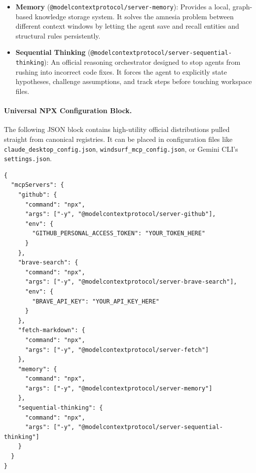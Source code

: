 \begin{itemize}
    \item \textbf{Memory} (\lstinline[style=inline]|@modelcontextprotocol/server-memory|): Provides a local, graph-based knowledge storage system. It solves the amnesia problem between different context windows by letting the agent save and recall entities and structural rules persistently.
    \item \textbf{Sequential Thinking} (\lstinline[style=inline]|@modelcontextprotocol/server-sequential-thinking|): An official reasoning orchestrator designed to stop agents from rushing into incorrect code fixes. It forces the agent to explicitly state hypotheses, challenge assumptions, and track steps before touching workspace files.
\end{itemize}

\paragraph{Universal NPX Configuration Block.}
The following JSON block contains high-utility official distributions pulled straight from canonical registries. It can be placed in configuration files like \lstinline[style=inline]|claude_desktop_config.json|, \lstinline[style=inline]|windsurf_mcp_config.json|, or Gemini CLI's \lstinline[style=inline]|settings.json|.

\begin{lstlisting}[style=json]
{
  "mcpServers": {
    "github": {
      "command": "npx",
      "args": ["-y", "@modelcontextprotocol/server-github"],
      "env": {
        "GITHUB_PERSONAL_ACCESS_TOKEN": "YOUR_TOKEN_HERE"
      }
    },
    "brave-search": {
      "command": "npx",
      "args": ["-y", "@modelcontextprotocol/server-brave-search"],
      "env": {
        "BRAVE_API_KEY": "YOUR_API_KEY_HERE"
      }
    },
    "fetch-markdown": {
      "command": "npx",
      "args": ["-y", "@modelcontextprotocol/server-fetch"]
    },
    "memory": {
      "command": "npx",
      "args": ["-y", "@modelcontextprotocol/server-memory"]
    },
    "sequential-thinking": {
      "command": "npx",
      "args": ["-y", "@modelcontextprotocol/server-sequential-thinking"]
    }
  }
}
\end{lstlisting}
